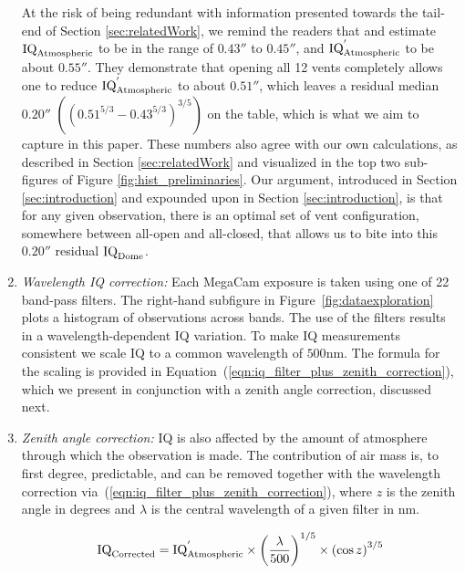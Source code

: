 \begin{enumerate}
At the risk of being redundant with information presented towards the tail-end of Section \ref{sec:relatedWork}, we remind the readers that \cite{racine2018} and \cite{salmon2009cfht} estimate ${\rm IQ}_{\rm Atmospheric}$ to be in the range of $0.43''$ to $0.45''$, and ${\rm IQ}_{\rm Atmospheric}^{'}$ to be about $0.55''$. They demonstrate that opening all 12 vents completely allows one to reduce ${\rm IQ}_{\rm Atmospheric}^{'}$ to about $0.51''$, which leaves a residual median $0.20''$ $\left((0.51^{5/3} - 0.43^{5/3})^{3/5}\right)$ on the table, which is what we aim to capture in this paper. These numbers also agree with our own calculations, as described in Section \ref{sec:relatedWork} and visualized in the top two sub-figures of Figure \ref{fig:hist_preliminaries}. Our argument, introduced in Section \ref{sec:introduction} and expounded upon in Section \ref{sec:introduction}, is that for any given observation, there is an optimal set of vent configuration, somewhere between all-open and all-closed, that allows us to bite into this $0.20''$ residual ${\rm IQ}_{\rm Dome}$. 

\item \textit{Wavelength IQ correction:}
Each MegaCam exposure is taken using one of 22 band-pass filters.  The right-hand subfigure in Figure~\ref{fig:dataexploration} plots a histogram of  observations across  bands. The use of the filters results in a wavelength-dependent IQ variation.   To make IQ measurements consistent we scale IQ to a common wavelength of $500$nm. The formula for the scaling is provided in Equation~(\ref{eqn:iq_filter_plus_zenith_correction}), which we present in conjunction with a zenith angle correction, discussed next.

\item \textit{Zenith angle correction:} IQ is also affected by the amount of atmosphere through which the observation is made. The contribution of air mass is, to first degree, predictable, and can be removed together with the wavelength correction via~(\ref{eqn:iq_filter_plus_zenith_correction}), where $z$ is the zenith angle in degrees and $\lambda$ is the central wavelength of a given filter in nm.

\begin{align}
\textrm{IQ}_{\textrm{Corrected}} = \textrm{IQ}_{\textrm{Atmospheric}}^{'} \times \left(\frac{\lambda}{500}\right)^{1/5} \times \left(\cos{z}\right)^{3/5} \label{eqn:iq_filter_plus_zenith_correction}
\end{align}
    

\end{enumerate}
